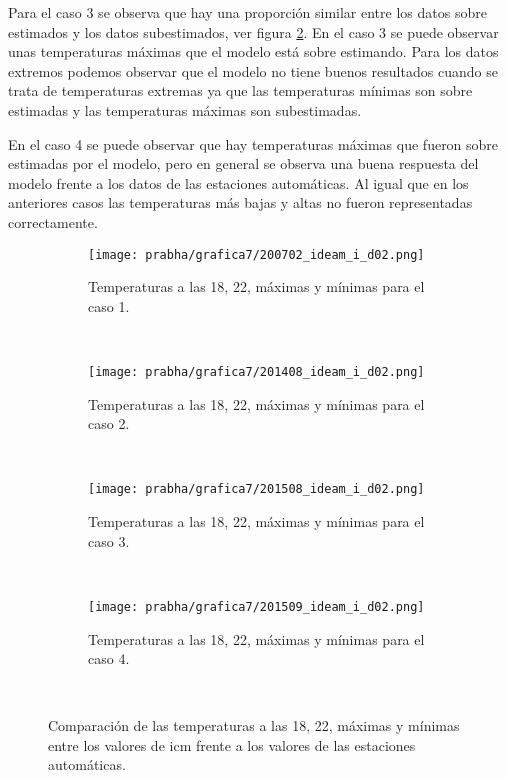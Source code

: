 Para el caso 3 se observa que hay una proporción similar entre los datos sobre estimados y los datos subestimados, ver figura \ref{subfig:tmp_ext_caso2_d01}. En el caso 3 se puede observar unas temperaturas máximas que el modelo está sobre estimando. Para los datos extremos podemos observar que el modelo no tiene buenos resultados cuando se trata de temperaturas extremas ya que las temperaturas mínimas son sobre estimadas y las temperaturas máximas son subestimadas.

En el caso 4 se  puede observar que hay temperaturas máximas que fueron sobre estimadas por el modelo, pero en general se observa una buena respuesta del modelo frente a los datos de las estaciones automáticas. Al igual que en los anteriores casos las temperaturas más bajas y altas no fueron representadas correctamente.


\begin{figure}[H]
    \centering
    \begin{subfigure}[b]{0.45\textwidth}
        \caption{Temperaturas a las 18, 22, máximas y mínimas para el caso 1.}
	\texttt{[image: prabha/grafica7/200702\_ideam\_i\_d02.png]}
    \label{subfig:tmp_ext_caso1_d01}
	\end{subfigure}
	~
	    \begin{subfigure}[b]{0.45\textwidth}
        \caption{Temperaturas a las 18, 22, máximas y mínimas para el caso 2.}
	\texttt{[image: prabha/grafica7/201408\_ideam\_i\_d02.png]}

    \label{subfig:tmp_ext_caso2_d01}
	\end{subfigure}
	~
	    \begin{subfigure}[b]{0.45\textwidth}
        \caption{Temperaturas a las 18, 22, máximas y mínimas para el caso 3.}
	\texttt{[image: prabha/grafica7/201508\_ideam\_i\_d02.png]}
    \label{subfig:tmp_ext_cas31_d01}
	\end{subfigure}
	~
	    \begin{subfigure}[b]{0.45\textwidth}
        \caption{Temperaturas a las 18, 22, máximas y mínimas para el caso 4.}
	\texttt{[image: prabha/grafica7/201509\_ideam\_i\_d02.png]}
    
    \label{subfig:tmp_ext_caso4_d01}
	\end{subfigure}
	~

\caption{Comparación de las temperaturas a las 18, 22, máximas y mínimas entre los valores de icm frente a los valores de las estaciones automáticas.}	
\label{subfig:tmp_ext_d01}	
\end{figure}

